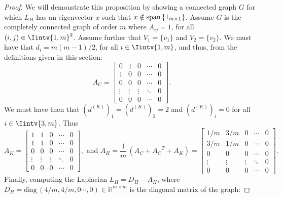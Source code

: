 \begin{proof}
   We will demonstrate this proposition by showing a connected graph $G$ for which $L_H$ has an eigenvector $x$ such that $x \notin \mathcal {\operatorname{span\,}} \{ 1_{m \times 1} \}$. 
   Assume $G$ is the completely connected graph of order $m$ where $A_{ij} = 1$, for all $(i,j) \in \Iintv{1,m}^2$.
   Assume further that $V_1 = \{ v_1 \}$ and $V_2 = \{ v_2 \}$.
   We must have that $d_i = m(m-1)/2$, for all $i \in \Iintv{1,m}$, and thus, from the definitions given in this section:
   \begin{equation*}
      A_C = 
      \begin{bmatrix}
         0 & 1 & 0 & \cdots & 0 \\
         1 & 0 & 0 & \cdots & 0 \\
         0 & 0 & 0 & \cdots & 0 \\
         \vdots & \vdots & \vdots & \ddots & 0 \\
         0 & 0 & 0 & \cdots & 0 
      \end{bmatrix}.
   \end{equation*}
   We must have then that $\left( d^{(K)} \right) _1 = \left( d^{(K)} \right)_2 = 2$ and $\left( d^{(K)} \right)_i = 0$ for all $i \in \Iintv{3,m}$. Thus
   \begin{equation*}
      A_K =
      \begin{bmatrix}
         1 & 1 & 0 & \cdots & 0 \\
         1 & 1 & 0 & \cdots & 0 \\
         0 & 0 & 0 & \cdots & 0 \\
         \vdots & \vdots & \vdots & \ddots & 0 \\
         0 & 0 & 0 & \cdots & 0 
      \end{bmatrix},
      \text{ and }
      A_H = \frac{1}{m} \, (A_C + {A_C}^T + A_K) = 
      \begin{bmatrix}
         1/m & 3/m & 0 & \cdots & 0 \\
         3/m & 1/m & 0 & \cdots & 0 \\
         0 & 0 & 0 & \cdots & 0 \\
         \vdots & \vdots & \vdots & \ddots & 0 \\
         0 & 0 & 0 & \cdots & 0 
      \end{bmatrix}.
   \end{equation*}
   Finally, computing the Laplacian $L_H = D_H - A_H$, where $D_H = \text{diag} \,(4/m, 4/m, 0 \cdots, 0) \in \mathbb R^{m \times m}$ is the diagonal matrix of the graph:

\end{proof}
